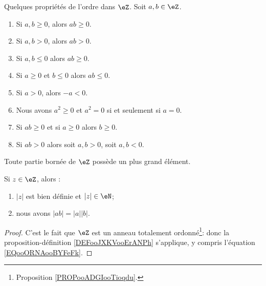 \begin{proposition}	\label{PROPooYFUBooJUZgwH}
	Quelques propriétés de l'ordre dans \( \eZ\). Soit \( a, b \in \eZ\).
	\begin{enumerate}
		\item		\label{ITEMooULKWooLmKBse}
		      Si \( a,b\geq 0\), alors \( ab\geq 0\).
		\item	\label{ITEMooSAJPooEDSgXJ}
		      Si \( a,b>0\), alors \( ab>0\).
		\item		\label{ITEMooINGNooOgSGiF}
		      Si \( a,b\leq 0\) alors \( ab\geq 0\).
		\item	\label{ITEMooOGFXooDvLKAE}
		      Si \( a\geq 0\) et \( b\leq 0\) alors \( ab\leq 0\).
		\item	\label{ITEMooRelatifsOrdreOppose}
		      Si \( a>0\), alors \( -a<0\).
		\item	\label{ITEMooRelatifsOrdreCarrePositif}
		      Nous avons \( a^2\geq 0\) et \( a^2=0\) si et seulement si \( a=0\).
		\item		\label{ITEMooBUHIooLJOSLQ}
		      Si \( ab\geq 0\) et si \( a\geq 0\) alors \( b\geq 0\).
		\item		\label{ITEMooGDFPooBbpBgn}
		      Si \( ab>0\) alors soit \( a,b>0\), soit \( a,b<0\).
	\end{enumerate}
\end{proposition}

\begin{lemma}       \label{LEMooMYEIooNFwNVI}
	Toute partie bornée de \( \eZ\) possède un plus grand élément.
\end{lemma}

\begin{proposition}	\label{PROPooRelatifsValAbs}
	Si \( z \in \eZ \), alors :
	\begin{enumerate}
		\item
		      \( |z| \) est bien définie et \( |z| \in \eN \);
		\item
		      nous avons \( | ab |=| a || b | \).
	\end{enumerate}
\end{proposition}

\begin{proof}
	C'est le fait que \( \eZ\) est un anneau totalement ordonné\footnote{Proposition \ref{PROPooADGIooTioqdu}.}: donc la proposition-définition \ref{DEFooJXKVooErANPh} s'applique, y compris l'équation \eqref{EQooORNAooBYFeFk}.
\end{proof}


